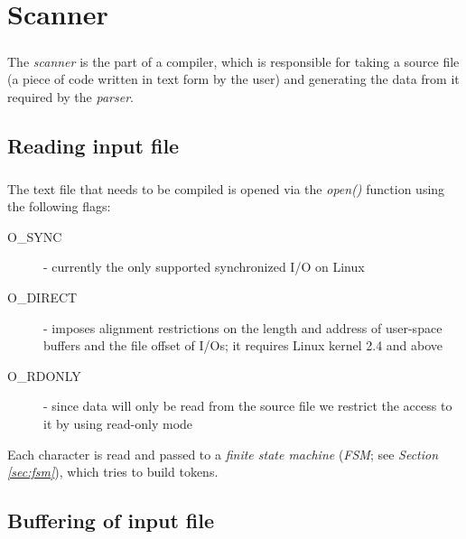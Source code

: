 \chapter{Scanner} 
\label{chapter:scanner}
\paragraph{}
  The \textit{scanner} is the part of a compiler, which is responsible for taking a source file (a piece of code written in text form by the user) and generating the data from it required by the \textit{parser}.
  
  	\section{Reading input file}
  	\paragraph{}
  		The text file that needs to be compiled is opened via the \textit{open()} function using the following flags:
  		\begin{description}
  			\item[O\_SYNC] - currently the only supported synchronized I/O on Linux
  			\item[O\_DIRECT] - imposes alignment restrictions on the length and address of user-space buffers and the file offset of I/Os; it requires Linux kernel 2.4 and above
  			\item[O\_RDONLY] - since data will only be read from the source file we restrict the access to it by using read-only mode
  		\end{description}
  	
  	Each character is read and passed to a \textit{finite state machine} (\textit{FSM}; see \textit{Section \ref{sec:fsm}}), which tries to build tokens.
  	
	\section{Buffering of input file}
	\label{sec:bufferin}

